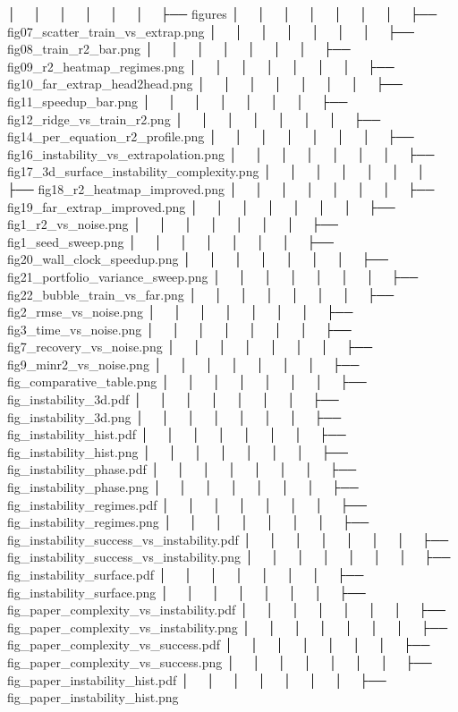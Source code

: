 │   │       │   │   │   │   ├── figures
│   │       │   │   │   │   │   ├── fig07_scatter_train_vs_extrap.png
│   │       │   │   │   │   │   ├── fig08_train_r2_bar.png
│   │       │   │   │   │   │   ├── fig09_r2_heatmap_regimes.png
│   │       │   │   │   │   │   ├── fig10_far_extrap_head2head.png
│   │       │   │   │   │   │   ├── fig11_speedup_bar.png
│   │       │   │   │   │   │   ├── fig12_ridge_vs_train_r2.png
│   │       │   │   │   │   │   ├── fig14_per_equation_r2_profile.png
│   │       │   │   │   │   │   ├── fig16_instability_vs_extrapolation.png
│   │       │   │   │   │   │   ├── fig17_3d_surface_instability_complexity.png
│   │       │   │   │   │   │   ├── fig18_r2_heatmap_improved.png
│   │       │   │   │   │   │   ├── fig19_far_extrap_improved.png
│   │       │   │   │   │   │   ├── fig1_r2_vs_noise.png
│   │       │   │   │   │   │   ├── fig1_seed_sweep.png
│   │       │   │   │   │   │   ├── fig20_wall_clock_speedup.png
│   │       │   │   │   │   │   ├── fig21_portfolio_variance_sweep.png
│   │       │   │   │   │   │   ├── fig22_bubble_train_vs_far.png
│   │       │   │   │   │   │   ├── fig2_rmse_vs_noise.png
│   │       │   │   │   │   │   ├── fig3_time_vs_noise.png
│   │       │   │   │   │   │   ├── fig7_recovery_vs_noise.png
│   │       │   │   │   │   │   ├── fig9_minr2_vs_noise.png
│   │       │   │   │   │   │   ├── fig_comparative_table.png
│   │       │   │   │   │   │   ├── fig_instability_3d.pdf
│   │       │   │   │   │   │   ├── fig_instability_3d.png
│   │       │   │   │   │   │   ├── fig_instability_hist.pdf
│   │       │   │   │   │   │   ├── fig_instability_hist.png
│   │       │   │   │   │   │   ├── fig_instability_phase.pdf
│   │       │   │   │   │   │   ├── fig_instability_phase.png
│   │       │   │   │   │   │   ├── fig_instability_regimes.pdf
│   │       │   │   │   │   │   ├── fig_instability_regimes.png
│   │       │   │   │   │   │   ├── fig_instability_success_vs_instability.pdf
│   │       │   │   │   │   │   ├── fig_instability_success_vs_instability.png
│   │       │   │   │   │   │   ├── fig_instability_surface.pdf
│   │       │   │   │   │   │   ├── fig_instability_surface.png
│   │       │   │   │   │   │   ├── fig_paper_complexity_vs_instability.pdf
│   │       │   │   │   │   │   ├── fig_paper_complexity_vs_instability.png
│   │       │   │   │   │   │   ├── fig_paper_complexity_vs_success.pdf
│   │       │   │   │   │   │   ├── fig_paper_complexity_vs_success.png
│   │       │   │   │   │   │   ├── fig_paper_instability_hist.pdf
│   │       │   │   │   │   │   ├── fig_paper_instability_hist.png
